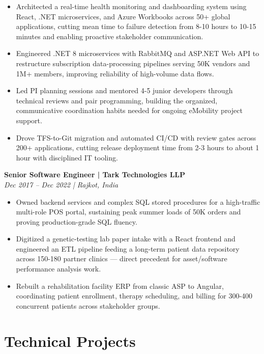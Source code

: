 \documentclass[letterpaper,10pt]{article}
\begin{document}
\begin{itemize}[leftmargin=0.15in,topsep=2pt,itemsep=2pt,parsep=0pt]
\item\small{Architected a real-time health monitoring and dashboarding system using React, .NET microservices, and Azure Workbooks across 50+ global applications, cutting mean time to failure detection from 8-10 hours to 10-15 minutes and enabling proactive stakeholder communication.}
\item\small{Engineered .NET 8 microservices with RabbitMQ and ASP.NET Web API to restructure subscription data-processing pipelines serving 50K vendors and 1M+ members, improving reliability of high-volume data flows.}
\item\small{Led PI planning sessions and mentored 4-5 junior developers through technical reviews and pair programming, building the organized, communicative coordination habits needed for ongoing eMobility project support.}
\item\small{Drove TFS-to-Git migration and automated CI/CD with review gates across 200+ applications, cutting release deployment time from 2-3 hours to about 1 hour with disciplined IT tooling.}
\end{itemize}

\noindent\textbf{Senior Software Engineer | Tark Technologies LLP}\\
{\small\textit{Dec 2017 – Dec 2022 | Rajkot, India}}\\[-2pt]

\begin{itemize}[leftmargin=0.15in,topsep=2pt,itemsep=2pt,parsep=0pt]
\item\small{Owned backend services and complex SQL stored procedures for a high-traffic multi-role POS portal, sustaining peak summer loads of 50K orders and proving production-grade SQL fluency.}
\item\small{Digitized a genetic-testing lab paper intake with a React frontend and engineered an ETL pipeline feeding a long-term patient data repository across 150-180 partner clinics — direct precedent for asset/software performance analysis work.}
\item\small{Rebuilt a rehabilitation facility ERP from classic ASP to Angular, coordinating patient enrollment, therapy scheduling, and billing for 300-400 concurrent patients across stakeholder groups.}
\end{itemize}


\section{Technical Projects}
\end{document}
